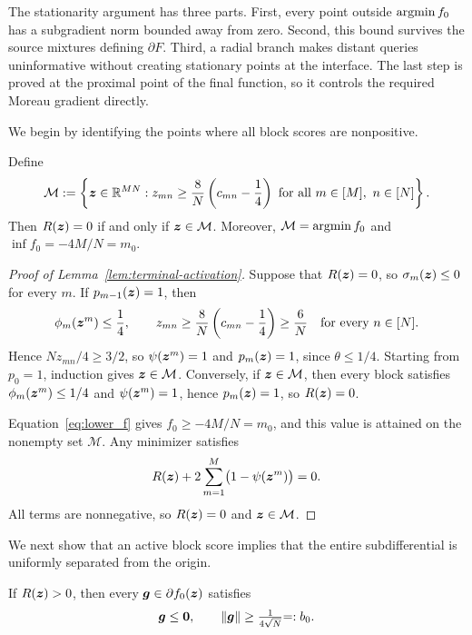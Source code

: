 The stationarity argument has three parts. First, every point
outside $\operatorname*{argmin} f_0$ has a subgradient norm bounded away from
zero. Second, this bound survives the source mixtures defining
$\partial F$. Third, a radial branch makes distant queries
uninformative without creating stationary points at the interface.
The last step is proved at the proximal point of the final function,
so it controls the required Moreau gradient directly.

We begin by identifying the points where all block scores are nonpositive.
\begin{lemma}
\label{lem:terminal-activation}
\label{newrand:raw-terminal}
Define
\[
 {\mathcal M}
 :=
 \left\{\bm{z}\in{\mathbb{R}}^{MN}:
 z_{mn}\geq\frac8N\left(c_{mn}-\frac14\right)
 \text{ for all }m\in[M],\ n\in[N]\right\}.
\]
Then \(R(\bm{z})=0\) if and only if \(\bm{z}\in{\mathcal M}\).
Moreover, \({\mathcal M}=\operatorname*{argmin}{f_0}\) and
\(\inf{f_0}={-4M/N=m_0}\).
\end{lemma}
\begin{proof}[Proof of Lemma~\ref{lem:terminal-activation}]
Suppose that \(R(\bm{z})=0\), so \(\sigma_m(\bm{z})\leq0\) for every \(m\).
If \({p_{m-1}(\bm{z})=1}\), then
\[
 \phi_{m}(\bm{z}^m)\leq\frac14,
 \qquad
 z_{mn}\geq\frac8N\left(c_{mn}-\frac14\right)\geq\frac6N
 \quad\text{for every }n\in[N].
\]
Hence \(Nz_{mn}/4\geq3/2\), so \(\psi(\bm{z}^m)=1\){ and $p_m(\bm{z})=1$, since $\theta\le1/4$}.
Starting from {\(p_0=1\)}, induction gives \(\bm{z}\in{\mathcal M}\).
Conversely, if \(\bm{z}\in{\mathcal M}\), then every block satisfies
\(\phi_{m}(\bm{z}^m)\leq1/4\) and \(\psi(\bm{z}^m)=1\){, hence $p_m(\bm{z})=1$}, so \(R(\bm{z})=0\).

Equation~\eqref{eq:lower_f} gives \({f_0}\geq{-4M/N=m_0}\), and this value
is attained on the nonempty set \({\mathcal M}\). Any minimizer satisfies
\[
 R(\bm{z})+{2}\sum_{m=1}^M\bigl(1-\psi(\bm{z}^m)\bigr)=0.
\]
All terms are nonnegative, so \(R(\bm{z})=0\) and \(\bm{z}\in{\mathcal M}\).
\end{proof}

We next show that an active block score implies that the entire subdifferential is
uniformly separated from the origin.

\begin{lemma}
\label{lem:active-subgradient-barrier}
If \(R(\bm{z})>0\), then every
\(\bm{g}\in\partial{f_0}(\bm{z})\) satisfies
\begin{equation}
 {\bm{g}\le{\mathbf 0},\qquad}
 \left\lVert \bm{g}\right\rVert\geq\tfrac{1}{4\sqrt N}{=:b_0}.
 \label{newrand:raw-barrier}
\end{equation}
\end{lemma}

